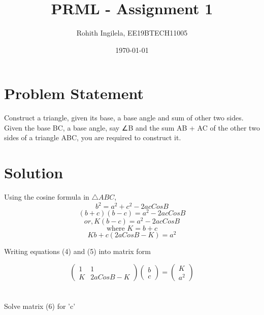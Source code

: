 \documentclass[letterpaper,12pt]{article}
\begin{document}
\pagecolor{white}
\color{black}
\title{PRML - Assignment 1}
\author{Rohith Ingilela, EE19BTECH11005}
\date{\today}
\maketitle



\section{Problem Statement}
Construct a triangle, given its base, a base angle and sum
of other two sides.
Given the base BC, a base angle, say ∠B and the sum AB + AC of the other two sides of a triangle ABC, you are required to construct it.
\begin{center}
\end{center}

\section{Solution}

Using the cosine formula in $\triangle ABC$,
\begin{equation}
    b^2 = a^2 + c^2 - 2ac Cos B    
\end{equation}
\begin{equation}
    (b + c)(b - c) = a^2 - 2ac Cos B
\end{equation}
\begin{equation}
    or, K(b - c) = a^2 - 2ac Cos B
\end{equation}
\begin{equation}
    \text{where }  K = b + c
\end{equation}
\begin{equation}
    Kb + c (2aCosB - K) = a^2
\end{equation}

    Writing equations (4) and (5) into matrix form

\begin{equation}
    \begin{pmatrix}
     1 &  1 \\
     K & 2aCosB - K
    \end{pmatrix}
    \begin{pmatrix}
     b \\
     c
    \end{pmatrix}
    =
    \begin{pmatrix}
     K \\
     a^2
    \end{pmatrix}
\end{equation} \\
\clearpage
   \\   
Solve matrix (6) for 'c'
\end{document}
